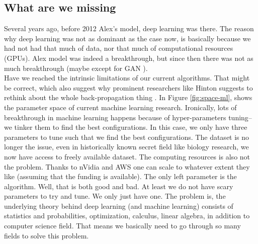 \documentclass[]{article}
\begin{document}
\subsection{What are we missing}
Several years ago, before 2012 Alex's \cite{imagenet} model, deep learning was
there. The reason why deep learning was not as dominant as the case now, is
basically because we had not had that much of data, nor that much of
computational resources (GPUs). Alex model was indeed a breakthrough, but since
then there was not as much breakthrough (maybe except for GAN \cite{gan}).\\

Have we reached the intrinsic limitations of our current algorithms. That might be correct,
which also suggest why prominent researchers like Hinton suggests to rethink about the
whole back-propagation thing \cite{wiki:hinton}. In Figure
\ref{fig:space-ml}, shows the parameter space of current machine learning
research. Ironically, lots of breakthrough in machine learning happens because
of hyper-parameters tuning--we tinker them to find the best configurations. In this case, we only have three parameters to tune
such that we find the best configurations. The dataset is no longer the issue,
even in historically known secret field like biology research, we now have
access to freely available dataset. The computing resources is also not the
problem. Thanks to nVidia and AWS one can scale to whatever extent they like
(assuming that the funding is available). The only left parameter is the
algorithm. Well, that is both good and bad. At least we do not have scary
parameters to try and tune. We only just have one. The problem is, the
underlying theory behind deep learning (and machine learning) consists of
statistics and probabilities, optimization, calculus, linear algebra, in
addition to computer science field. That means we basically need to go through
so many fields to solve this problem. 
\end{document}
